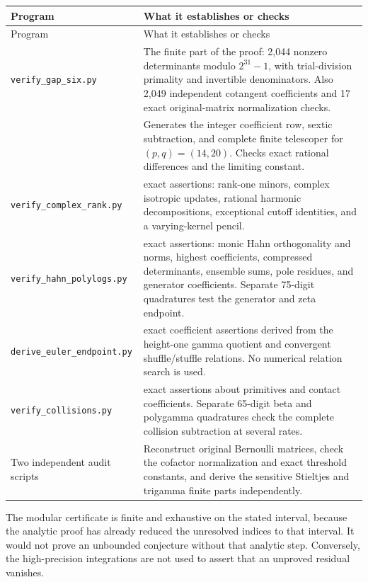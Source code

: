 \begin{longtable}{@{}>{\raggedright\arraybackslash}p{}
 >{\raggedright\arraybackslash}p{}@{}}
\toprule
Program & What it establishes or checks\\
\midrule
\endfirsthead
\toprule
Program & What it establishes or checks\\
\midrule
\endhead
\texttt{verify\_gap\_six.py} &
The finite part of the proof: 2,044 nonzero determinants modulo
$2^{31}-1$, with trial-division primality and invertible
denominators. Also 2,049 independent cotangent coefficients
and 17 exact original-matrix normalization checks.\\[7pt]
{\small\texttt{create\_gap\_six\_example.py}} &
Generates the integer coefficient row, sextic subtraction,
and complete finite telescoper for $(p,q)=(14,20)$.
Checks exact rational differences and the limiting constant.\\[7pt]
\texttt{verify\_complex\_rank.py} &
66 exact assertions: rank-one minors, complex isotropic
updates, rational harmonic decompositions, exceptional cutoff
identities, and a varying-kernel pencil.\\[7pt]
\texttt{verify\_hahn\_polylogs.py} &
149 exact assertions: monic Hahn orthogonality and norms,
highest coefficients, compressed determinants, ensemble sums,
pole residues, and generator coefficients. Separate
75-digit quadratures test the generator and zeta endpoint.\\[7pt]
\texttt{derive\_euler\_endpoint.py} &
21 exact coefficient assertions derived from the height-one
gamma quotient and convergent shuffle/stuffle relations.
No numerical relation search is used.\\[7pt]
\texttt{verify\_collisions.py} &
119 exact assertions about primitives and contact coefficients.
Separate 65-digit beta and polygamma quadratures check the
complete collision subtraction at several rates.\\[7pt]
Two independent audit scripts &
Reconstruct original Bernoulli matrices, check the cofactor
normalization and exact threshold constants, and derive the
sensitive Stieltjes and trigamma finite parts independently.\\
\bottomrule
\end{longtable}

The modular certificate is finite and exhaustive on the stated
interval, because the analytic proof has already reduced the
unresolved indices to that interval. It would not prove an
unbounded conjecture without that analytic step. Conversely,
the high-precision integrations are not used to assert that an
unproved residual vanishes.

